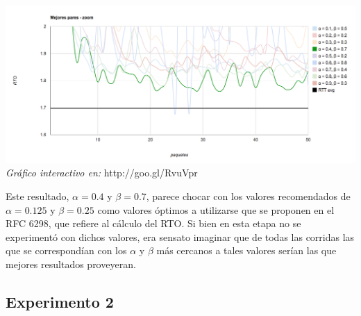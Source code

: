 \begin{center}
	\includegraphics[scale=0.35]{graphics/best_pairs_zoom.png}
	\textit{Gráfico interactivo en:} http://goo.gl/RvuVpr
\end{center}

\indent Este resultado, $\alpha = 0.4$ y $\beta=0.7$, parece chocar con los valores recomendados de $\alpha = 0.125$  y $\beta = 0.25$ como valores óptimos a utilizarse que se proponen en el RFC 6298, que refiere al cálculo del RTO. Si bien en esta etapa no se experimentó con dichos valores, era sensato imaginar que de todas las corridas las que se correspondían con los $\alpha$ y $\beta$ más cercanos a tales valores serían las que mejores resultados proveyeran.\\


\subsection{Experimento 2}

